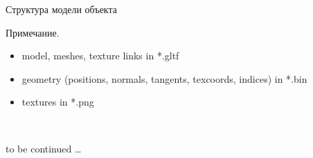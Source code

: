 \documentclass{beamer}
\begin{document}
\begin{frame}{Структура модели объекта}
{{			\scriptsize
			Примечание.
			\begin{itemize} \scriptsize
				\item model, meshes, texture links in *.gltf
				\item geometry (positions, normals, tangents, texcoords, indices) in *.bin
				\item textures in *.png
			\end{itemize}

			~
		}
	}
\end{frame}

\begin{frame}{}{}
	to be continued \dots
\end{frame}
\end{document}
